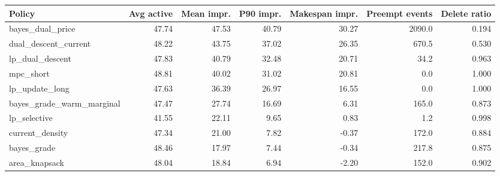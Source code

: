 \begin{tabular}{lrrrrrr}
\toprule
Policy & Avg active & Mean impr. & P90 impr. & Makespan impr. & Preempt events & Delete ratio \\
\midrule
bayes\_dual\_price & 47.74 & 47.53 & 40.79 & 30.27 & 2090.0 & 0.194 \\
dual\_descent\_current & 48.22 & 43.75 & 37.02 & 26.35 & 670.5 & 0.530 \\
lp\_dual\_descent & 47.83 & 40.79 & 32.48 & 20.71 & 34.2 & 0.963 \\
mpc\_short & 48.81 & 40.02 & 31.02 & 20.81 & 0.0 & 1.000 \\
lp\_update\_long & 47.63 & 36.39 & 26.97 & 16.55 & 0.0 & 1.000 \\
bayes\_grade\_warm\_marginal & 47.47 & 27.74 & 16.69 & 6.31 & 165.0 & 0.873 \\
lp\_selective & 41.55 & 22.11 & 9.65 & 0.83 & 1.2 & 0.998 \\
current\_density & 47.34 & 21.00 & 7.82 & -0.37 & 172.0 & 0.884 \\
bayes\_grade & 48.46 & 17.97 & 7.44 & -0.34 & 217.8 & 0.875 \\
area\_knapsack & 48.04 & 18.84 & 6.94 & -2.20 & 152.0 & 0.902 \\
\bottomrule
\end{tabular}
